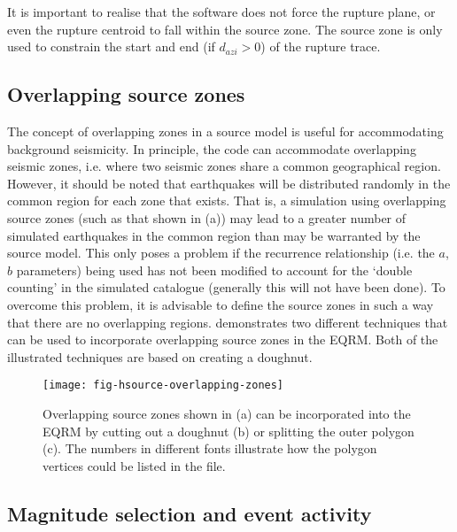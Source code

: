 It is important to realise that the  software
does not force the rupture plane, or even the rupture centroid to
fall within the source zone. The source zone is only used to
constrain the start and end (if $d_{azi}>0$) of the rupture trace.




\subsection{Overlapping source zones}

The concept of overlapping zones in a source model is useful for
accommodating background seismicity. In principle, the code can
accommodate overlapping seismic zones, i.e. where two seismic
zones share a common geographical region. However, it should be
noted that earthquakes will be distributed randomly in the common
region for each zone that exists. That is, a simulation using
overlapping source zones (such as that shown in
(a)) may lead to a greater number
of simulated earthquakes in the common
region than may be warranted by the source model. This only poses
a problem if the recurrence relationship (i.e. the $a$, $b$
parameters) being used has not been modified to account for the
`double counting' in the simulated catalogue (generally this will
not have been done). To overcome this problem, it is advisable to
define the source zones in such a way that there are no
overlapping regions.  demonstrates
two different techniques that can be used to incorporate
overlapping source zones in the EQRM. Both of the illustrated
techniques are based on creating a doughnut.

\begin{figure}[htp]
\texttt{[image: fig-hsource-overlapping-zones]}
\caption{Overlapping source zones shown in (a) can be incorporated
into the EQRM by cutting out a doughnut (b) or splitting the outer
polygon (c). The numbers in different fonts illustrate how the
polygon vertices could be listed in the
 file.
} \label{fig:h-source-overlapping}
\end{figure}



\subsection{Magnitude selection and event activity}
\label{sec:magnitude_selection}

